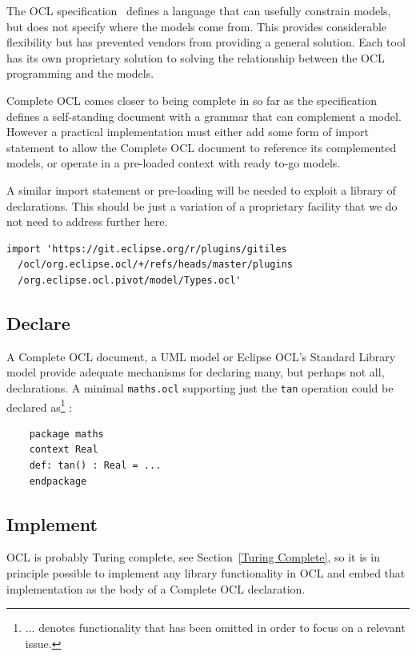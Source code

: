 \documentclass[sigconf]{acmart}
\begin{document}
The OCL specification~\cite{OCL-2.4} defines a language that can usefully constrain models, but does not specify where the models come from. This provides considerable flexibility but has prevented vendors from providing a general solution. Each tool has its own proprietary solution to solving the relationship between the OCL programming and the models.

Complete OCL comes closer to being complete in so far as the specification defines a self-standing document with a grammar that can complement a model. However a practical implementation must either add some form of import statement to allow the Complete OCL document to reference its complemented models, or operate in a pre-loaded context with ready to-go models.

A similar import statement or pre-loading will be needed to exploit a library of declarations. This should be just a variation of a proprietary facility that we do not need to address further here.

\begin{verbatim}
import 'https://git.eclipse.org/r/plugins/gitiles
  /ocl/org.eclipse.ocl/+/refs/heads/master/plugins
  /org.eclipse.ocl.pivot/model/Types.ocl'
\end{verbatim} 

\subsection{Declare}

A Complete OCL document, a UML model or Eclipse OCL's Standard Library model provide adequate mechanisms for declaring many, but perhaps not all, declarations. A minimal \verb|maths.ocl| supporting just the \verb|tan| operation could be declared as\footnote{... denotes functionality that has been omitted in order to focus on a relevant issue.}
:

\begin{verbatim}
	package maths
	context Real
	def: tan() : Real = ...
	endpackage
\end{verbatim} 


\subsection{Implement}

OCL is probably Turing complete, see Section~\ref{Turing Complete}, so it is in principle possible to implement any library functionality in OCL and embed that implementation as the body of a Complete OCL declaration.
\end{document}
